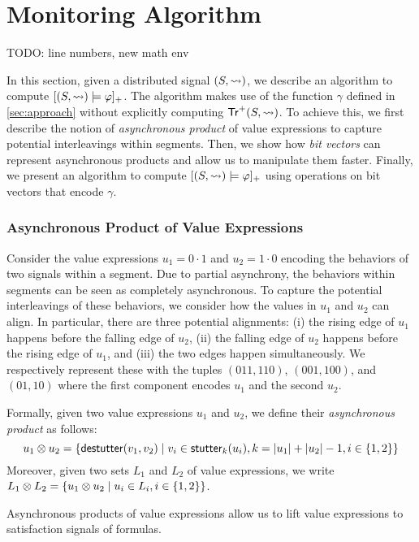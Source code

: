 \section{Monitoring Algorithm} \label{sec:algorithm}
\alert{TODO: line numbers, new math env}

In this section, given a distributed signal $(S,{\rightsquigarrow})$, we describe an algorithm to compute $[(S,{\rightsquigarrow}) \models \varphi]_+$.
The algorithm makes use of the function $\gamma$ defined in \cref{sec:approach} without explicitly computing $\mathsf{Tr}^+(S,{\rightsquigarrow})$.
To achieve this, we first describe the notion of \emph{asynchronous product} of value expressions to capture potential interleavings within segments.
Then, we show how \emph{bit vectors} can represent asynchronous products and allow us to manipulate them faster.
Finally, we present an algorithm to compute $[(S,{\rightsquigarrow}) \models \varphi]_+$ using operations on bit vectors that encode $\gamma$.

\subsubsection{Asynchronous Product of Value Expressions}
Consider the value expressions $u_1 = 0 \cdot 1$ and $u_2 = 1 \cdot 0$ encoding the behaviors of two signals within a segment.
Due to partial asynchrony, the behaviors within segments can be seen as completely asynchronous.
To capture the potential interleavings of these behaviors, we consider how the values in $u_1$ and $u_2$ can align.
In particular, there are three potential alignments:
(i) the rising edge of $u_1$ happens before the falling edge of $u_2$,
(ii) the falling edge of $u_2$ happens before the rising edge of $u_1$, and
(iii) the two edges happen simultaneously.
We respectively represent these with the tuples $(011, 110)$, $(001, 100)$, and $(01, 10)$ where the first component encodes $u_1$ and the second $u_2$.

Formally, given two value expressions $u_1$ and $u_2$, we define their \emph{asynchronous product} as follows:
\small
$$u_1 \otimes u_2 = \{ \destutter(v_1, v_2) \st v_i \in \stutter_k(u_i), k = |u_1| + |u_2| - 1, i \in \{1,2\} \}$$  
\normalsize
Moreover, given two sets $L_1$ and $L_2$ of value expressions, we write $L_1 \otimes L_2 = \{ u_1 \otimes u_2 \st u_i \in L_i, i \in \{1,2\} \}$.

Asynchronous products of value expressions allow us to lift value expressions to satisfaction signals of formulas.

